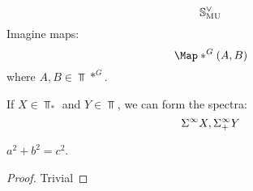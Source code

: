 \documentclass{amsart}
\begin{document}
$$ \S\compl[\MU] $$
Imagine maps:
$$ \Map*^G(A, B) $$
where $ A, B \in \Top*^G $.

If $ X \in \Top_* $ and $ Y \in \Top $, we can form the spectra:
$$ \Suspinf X, \Suspinf+ Y $$

\begin{thm}[Pythagoras]
$ a^2 + b^2 = c^2 $.
\begin{proof}
Trivial
\end{proof}
\end{thm}
\end{document}
